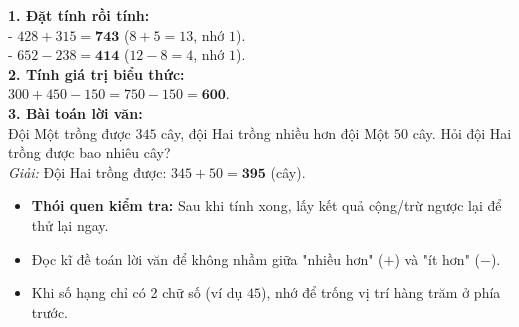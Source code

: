 \documentclass[10pt,a4paper]{article}
\begin{document}
\vspace{-1.5mm}
\noindent
\begin{minipage}[t]{0.49\textwidth}\vspace{0pt}
\begin{tcolorbox}[
  enhanced,
  colback=green!4!white,
  colframe=green!60!black,
  arc=2mm, boxrule=0.8pt,
  left=2mm, right=2mm, top=1.8mm, bottom=1.8mm,
  title={\footnotesize\bfseries\color{white}\faCheckCircle\ 4. Bài tập thực hành mẫu}
]
{\footnotesize
\textbf{1. Đặt tính rồi tính:}\\
- $428 + 315 = \mathbf{743}$ ($8+5=13$, nhớ $1$).\\
- $652 - 238 = \mathbf{414}$ ($12-8=4$, nhớ $1$).\\
\textbf{2. Tính giá trị biểu thức:}\\
$300 + 450 - 150 = 750 - 150 = \mathbf{600}$.\\
\textbf{3. Bài toán lời văn:}\\
Đội Một trồng được $345$ cây, đội Hai trồng nhiều hơn đội Một $50$ cây. Hỏi đội Hai trồng được bao nhiêu cây?\\
\textit{Giải:} Đội Hai trồng được: $345 + 50 = \mathbf{395}$ (cây).
}
\end{tcolorbox}
\end{minipage}
\hfill
\begin{minipage}[t]{0.49\textwidth}\vspace{0pt}
\begin{tcolorbox}[
  enhanced,
  colback=rose!4!white,
  colframe=rose!70!black,
  arc=2mm, boxrule=0.8pt,
  left=2mm, right=2mm, top=1.8mm, bottom=1.8mm,
  title={\footnotesize\bfseries\color{white}\faExclamationTriangle\ 5. Lời dặn dò quan trọng}
]
{\footnotesize
\begin{itemize}\setlength{\itemsep}{1.5pt}\setlength{\leftskip}{-2.5mm}
  \item \textbf{Thói quen kiểm tra:} Sau khi tính xong, lấy kết quả cộng/trừ ngược lại để thử lại ngay.
  \item Đọc kĩ đề toán lời văn để không nhầm giữa "nhiều hơn" ($+$) và "ít hơn" ($-$).
  \item Khi số hạng chỉ có 2 chữ số (ví dụ $45$), nhớ để trống vị trí hàng trăm ở phía trước.
\end{itemize}
}
\end{tcolorbox}
\end{minipage}
\end{document}
